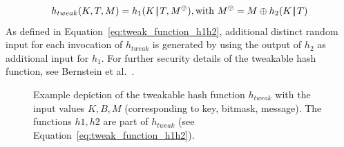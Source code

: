 \begin{equation}
\label{eq:tweak_function_h1h2}
h_{tweak}(K,T,M) = h_1(K \operatorname{|\!\!|} T , M^{\oplus}), \text{with } M^{\oplus}=M \oplus h_2(K \operatorname{|\!\!|} T)
\end{equation}
As defined in Equation~\ref{eq:tweak_function_h1h2}, additional distinct random input for each invocation of $h_{tweak}$ is generated by using the output of $h_2$ as additional input for $h_1$. For further security details of the tweakable hash function, see Bernstein et al.~\cite{tweakable_basispaper_sphincs_2019}. 

\begin{figure}
\centering
{}
\caption{Example depiction of the tweakable hash function $h_{tweak}$ with the input values $K,B,M$ (corresponding to key, bitmask, message). The functions $h1, h2$ are part of $h_{tweak}$ (see Equation~\ref{eq:tweak_function_h1h2}).}
\label{img:h_tweak}
\end{figure}

